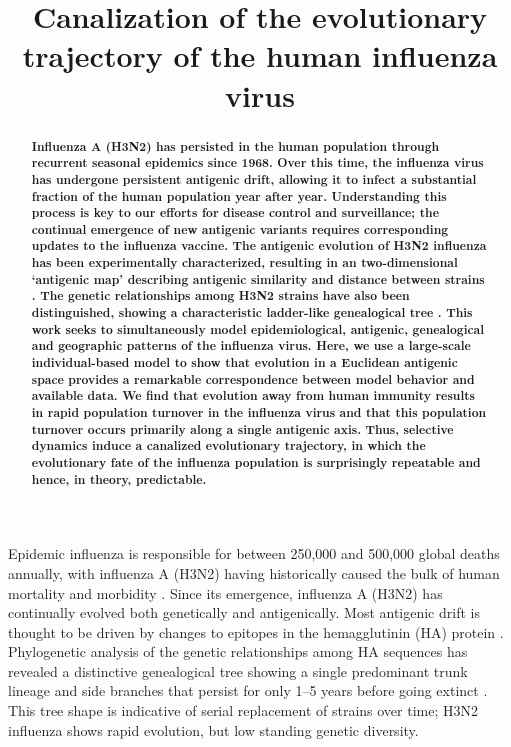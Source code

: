 \renewcommand{\thefigure}{Fig.~\arabic{figure}}
\renewcommand{\thetable}{Table~\arabic{table}}

\title{\Large \bf Canalization of the evolutionary trajectory of the human influenza virus}
\maketitle

\begin{abstract}
\bf \noindent Influenza A (H3N2) has persisted in the human population through recurrent seasonal epidemics since 1968.  Over this time, the influenza virus has undergone persistent antigenic drift, allowing it to infect a substantial fraction of the human population year after year.  Understanding this process is key to our efforts for disease control and surveillance; the continual emergence of new antigenic variants requires corresponding updates to the influenza vaccine.  The antigenic evolution of H3N2 influenza has been experimentally characterized, resulting in an two-dimensional `antigenic map' describing antigenic similarity and distance between strains \cite{Smith04}.  The genetic relationships among H3N2 strains have also been distinguished, showing a characteristic ladder-like genealogical tree \cite{Fitch97}.  This work seeks to simultaneously model epidemiological, antigenic, genealogical and geographic patterns of the influenza virus.  Here, we use a large-scale individual-based model to show that evolution in a Euclidean antigenic space provides a remarkable correspondence between model behavior and available data.  We find that evolution away from human immunity results in rapid population turnover in the influenza virus and that this population turnover occurs primarily along a single antigenic axis.  Thus, selective dynamics induce a canalized evolutionary trajectory, in which the evolutionary fate of the influenza population is surprisingly repeatable and hence, in theory, predictable.
\end{abstract}

\pagebreak

Epidemic influenza is responsible for between 250,000 and 500,000 global deaths annually, with influenza A (H3N2) having historically caused the bulk of human mortality and morbidity \cite{flufactsheet}.  Since its emergence, influenza A (H3N2) has continually evolved both genetically and antigenically.  Most antigenic drift is thought to be driven by changes to epitopes in the hemagglutinin (HA) protein \cite{Nelson07NatRevGenet}.  Phylogenetic analysis of the genetic relationships among HA sequences has revealed a distinctive genealogical tree showing a single predominant trunk lineage and side branches that persist for only 1--5 years before going extinct \cite{Fitch97}.  This tree shape is indicative of serial replacement of strains over time; H3N2 influenza shows rapid evolution, but low standing genetic diversity.

